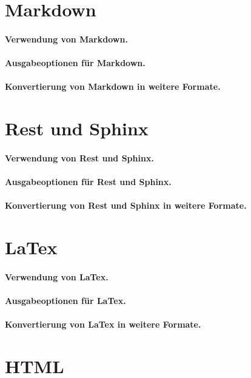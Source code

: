 \documentclass[%
oneside,                 %
final,                   %
chapterprefix=true,      %
open=right,              %
10pt]{book}
\begin{document}
\noindent

\section{Markdown}
\paragraph{ Verwendung von Markdown.}
\paragraph{ Ausgabeoptionen für Markdown.}
\paragraph{ Konvertierung von Markdown in weitere Formate.}
\section{Rest und Sphinx}
\paragraph{ Verwendung von Rest und Sphinx.}
\paragraph{ Ausgabeoptionen für Rest und Sphinx.}
\paragraph{ Konvertierung von Rest und Sphinx in weitere Formate.}
\section{LaTex}
\paragraph{ Verwendung von LaTex.}
\paragraph{ Ausgabeoptionen für LaTex.}
\paragraph{ Konvertierung von LaTex in weitere Formate.}
\section{HTML}
\end{document}
